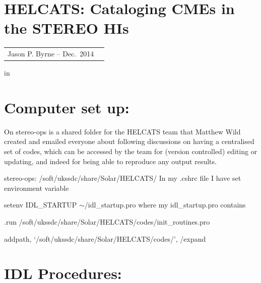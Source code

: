 \documentclass[12pt, a4paper, oneside]{article}
\begin{document}









\section*{\sc \Large HELCATS: Cataloging CMEs in the STEREO HIs}

 
 \begin{center}
\begin{tabular}{ll}
\large Jason P. Byrne -- Dec.~2014 
\end{tabular}
 \end{center}

 in

 


\section{Computer set up:}

On stereo-ops is a shared folder for the HELCATS team that Matthew Wild created and emailed everyone about following discussions on having a centralised set of codes, which can be accessed by the team for (version controlled) editing or updating, and indeed for being able to reproduce any output results.

stereo-ops: /soft/ukssdc/share/Solar/HELCATS/
\newline
\newline
In my .cshrc file I have set environment variable

setenv IDL\_STARTUP $\sim$/idl\_startup.pro
\newline
where my idl\_startup.pro contains 

.run /soft/ukssdc/share/Solar/HELCATS/codes/init\_routines.pro

addpath, `/soft/ukssdc/share/Solar/HELCATS/codes/', /expand


\vskip 0.2in

\section{IDL Procedures:}
\end{document}
